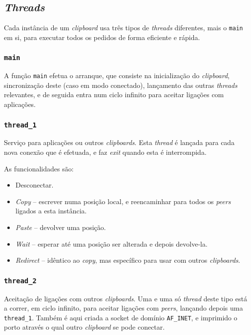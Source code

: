\documentclass{article}
\begin{document}
\subsection{\textit{Threads}}

Cada instância de um \textit{clipboard} usa três tipos de \textit{threads} diferentes, mais o \texttt{main} em si, para executar todos os pedidos de forma eficiente e rápida.

\subsubsection{\texttt{main}} 
A função \texttt{main} efetua o arranque, que consiste na inicialização do \textit{clipboard}, sincronização deste (caso em modo conectado), lançamento das outras \textit{threads} relevantes, e de seguida entra num ciclo infinito para aceitar ligações com aplicações.


\subsubsection{\texttt{thread\_1}}
Serviço para aplicações ou outros \textit{clipboards}.
Esta \textit{thread} é lançada para cada nova conexão que é efetuada, e faz \textit{exit} quando esta é interrompida. 

As funcionalidades são:
\begin{itemize} \setlength{\itemsep}{0pt}
    \item Desconectar. \\
    \item \textit{Copy} -- escrever numa posição local, e reencaminhar para todos os \textit{peers} ligados a esta instância. \\
    \item \textit{Paste} -- devolver uma posição. \\
    \item \textit{Wait} -- esperar até uma posição ser alterada e depois devolve-la. \\
    \item \textit{Redirect} -- idêntico ao \textit{copy}, mas específico para usar com outros \textit{clipboards}.
\end{itemize}

\subsubsection{\texttt{thread\_2}}
Aceitação de ligações com outros \textit{clipboards}. Uma e uma só \textit{thread} deste tipo está a correr, em ciclo infinito, para aceitar ligações com \textit{peers}, lançando depois uma \texttt{thread\_1}. 
Também é aqui criada a socket de domínio \texttt{AF\_INET}, e imprimido o porto através o qual outro \textit{clipboard} se pode conectar.
\end{document}

